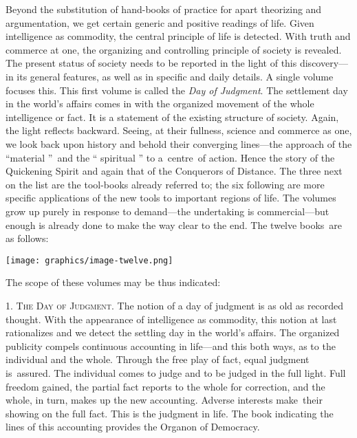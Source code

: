 \documentclass[openany,nobib]{tufte-book}
\begin{document}
Beyond the substitution of hand-books of practice for apart theorizing
and argumentation, we get certain generic and positive readings of life.
Given intelligence as commodity, the central principle of life is
detected. With truth and commerce at one, the organizing and controlling
principle of society is revealed. The present status of society needs to
be reported in the light of this discovery---in its general features, as
well as in specific and daily details. A single volume focuses this.
This first volume is called the \emph{Day of Judgment}. The settlement
day in the world's affairs comes in with the organized movement of the
whole intelligence or fact. It is a statement of the existing structure
of society. Again, the light reflects backward. Seeing, at their
fullness, science and commerce as one, we look back upon history and
behold their converging lines---the approach of the ``material ''~and
the `` spiritual '' to a~centre~of action. Hence the story of the
Quickening Spirit and again that of the Conquerors of Distance. The
three next on the list are the tool-books already referred to; the six
following are more specific applications of the new tools to important
regions of life. The volumes grow up purely in response to demand---the
undertaking is commercial---but enough is already done to make the way
clear to the end. The twelve books~are as follows:~

\begin{figure*}
   \texttt{[image: graphics/image-twelve.png]}
   \label{fig:fig12}
\end{figure*}

\newpage The scope of these volumes may be thus indicated:~

\vspace{.15in}

1. \textsc{The Day of Judgment}. The notion of a day of judgment is as old as
recorded thought. With the appearance of intelligence as commodity, this
notion at last rationalizes and we detect the settling day in the
world's affairs. The organized publicity compels continuous accounting
in life---and this both ways, as to the individual and the whole.
Through the free play of fact, equal judgment is~assured. The individual
comes to judge and to be judged in the full light. Full freedom gained,
the partial fact reports to the whole for correction, and the whole, in
turn, makes up the new accounting. Adverse interests make~their showing
on the full fact. This is the judgment in life. The book indicating the
lines of this accounting provides the Organon of Democracy.~
\end{document}
